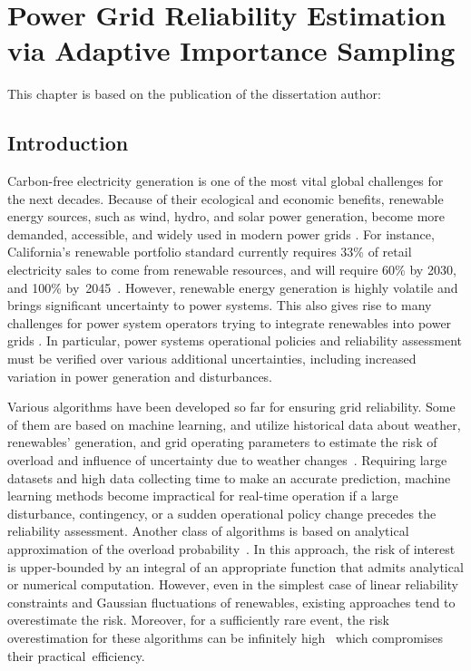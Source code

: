 \chapter{Power Grid Reliability Estimation via Adaptive Importance Sampling}
\label{chap:sampling}
This chapter is based on the publication of the dissertation author: 
\section{Introduction}
\label{sampling:introduction}

Carbon-free electricity generation is one of the most vital global challenges for the next decades. Because of their ecological and economic benefits, renewable energy sources, such as wind, hydro, and solar power generation, become more demanded, accessible, and widely used in modern power grids \cite{harjanne2019abandoning}. For instance, California's renewable portfolio standard currently requires 33\% of retail electricity sales to come from renewable resources, and will require 60\% by 2030, and 100\% by~2045~\cite{golden2003senate}.
However, renewable energy generation is highly volatile and brings significant uncertainty to power systems. This also gives rise to many challenges for power system operators trying to integrate renewables into power grids \cite{schmietendorf2017impact}. In particular, power systems operational policies and reliability assessment must be verified over various additional uncertainties, including increased variation in power generation and disturbances. 

Various algorithms have been developed so far for ensuring grid reliability. Some of them are based on machine learning, and utilize historical data about weather, renewables' generation, and grid operating parameters to estimate the risk of overload and influence of uncertainty due to weather changes~\cite{zhang2017data}. %
Requiring large datasets and high data collecting time to make an accurate prediction, machine learning methods become impractical for real-time operation if a large disturbance, contingency, or a sudden operational policy change precedes the reliability assessment. Another class of algorithms is based on analytical approximation of the overload probability~\cite{nemirovski2007convex}. In this approach, the risk of interest is upper-bounded by an integral of an appropriate function that admits analytical or numerical computation. However, even in the simplest case of linear reliability constraints and Gaussian fluctuations of renewables, existing approaches tend to overestimate the risk. Moreover, for a sufficiently rare event, the risk overestimation for these algorithms can be infinitely high~\cite{nemirovski2007convex} which compromises their practical~efficiency. 

